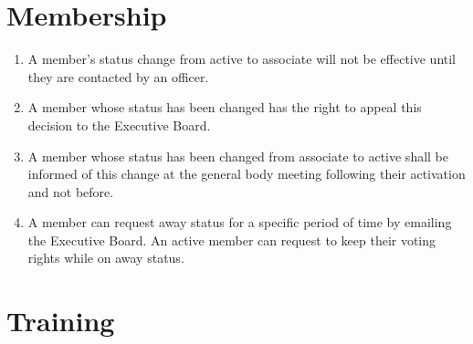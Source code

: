 \documentclass[12pt,letterpaper,oneside]{book}
\begin{document}
\section{Membership}

\begin{enumerate}

\item A member's status change from active to associate will not be effective until they are contacted by an officer.
\item A member whose status has been changed has the right to appeal this decision to the Executive Board.
\item A member whose status has been changed from associate to active shall be informed of this change at the general body meeting following their activation and not before.
\item A member can request away status for a specific period of time by emailing the Executive Board.  An active member can request to keep their voting rights while on away status.

\end{enumerate}

\section{Training}
\end{document}
